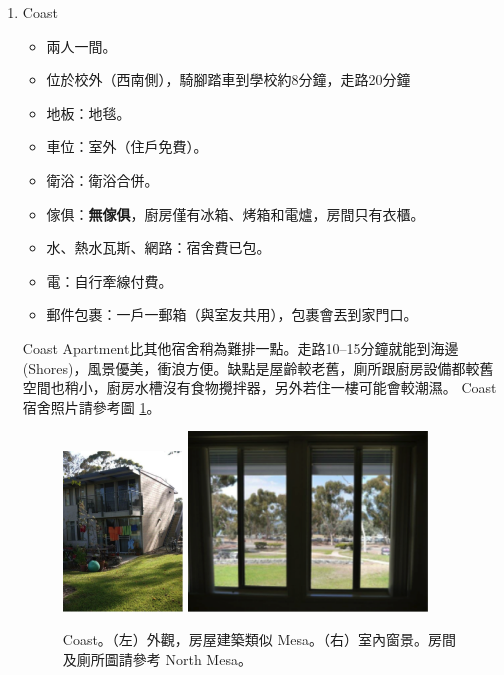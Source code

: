\documentclass[10pt,a4paper]{book}
\begin{document}
\begin{CJK}{UTF8}{bkai}
\begin{enumerate}
\item Coast
\begin{itemize}
\item 兩人一間。
\item 位於校外（西南側），騎腳踏車到學校約8分鐘，走路20分鐘
\item 地板：地毯。
\item 車位：室外（住戶免費）。
\item 衛浴：衛浴合併。
\item 傢俱：\textbf{無傢俱}，廚房僅有冰箱、烤箱和電爐，房間只有衣櫃。
\item 水、熱水瓦斯、網路：宿舍費已包。
\item 電：自行牽線付費。
\item 郵件包裹：一戶一郵箱（與室友共用），包裹會丟到家門口。
\end{itemize}
Coast Apartment比其他宿舍稍為難排一點。走路10--15分鐘就能到海邊(Shores)，風景優美，衝浪方便。缺點是屋齡較老舊，廁所跟廚房設備都較舊空間也稍小，廚房水槽沒有食物攪拌器，另外若住一樓可能會較潮濕。
Coast 宿舍照片請參考圖 \ref{fig:coast}。

\begin{figure}
\centering
\includegraphics[width=0.3\textwidth]{Pics/coast_1}
\includegraphics[width=0.6\textwidth]{Pics/coast_2}
\caption{Coast。（左）外觀，房屋建築類似 Mesa。（右）室內窗景。房間及廁所圖請參考 North Mesa。}\label{fig:coast}
\end{figure}


\end{enumerate}
\end{CJK}
\end{document}
